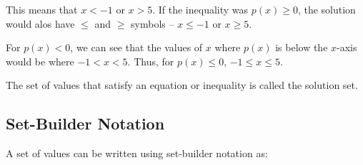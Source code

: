         \begin{figure}
            \begin{center}
            \end{center}
        \end{figure}

        This means that $x<-1$ or $x>5$.
        If the inequality was $p(x)\ge0$, the solution would alos have $\le$ and $\ge$ symbols -- $x\le-1$ or $x\ge5$.

        For $p(x)<0$, we can see that the values of $x$ where $p(x)$ is below the $x$-axis would be where $-1<x<5$.
        Thus, for $p(x)\le0$, $-1\le x\le5$.

        The set of values that satisfy an equation or inequality is called the solution set.

    \subsection{Set-Builder Notation}
        A set of values can be written using set-builder notation as:

